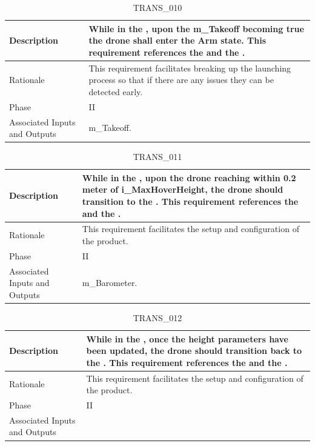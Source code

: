 \documentclass{article}
\begin{document}
\begin{table}[!h]
\begin{center}
\caption {TRANS\_010} 
\label{TRANS_013}
\begin{tabular}{ | m{3cm} | m{11cm} | }
\hline
Description & While in the \nameref{Arm State}, upon the m\_Takeoff becoming true the drone shall enter the Arm state. This requirement references the \nameref{Arm State} and the \nameref{Takeoff State}. \\
\hline
Rationale & This requirement facilitates breaking up the launching process so that if there are any issues they can be detected early.  \\
\hline
Phase & II \\
\hline
Associated Inputs and Outputs & m\_Takeoff. \\
\hline
\end{tabular}
\end{center}
\end{table}

\begin{table}[!h]
\begin{center}
\caption {TRANS\_011} 
\label{TRANS_014}
\begin{tabular}{ | m{3cm} | m{11cm} | }
\hline
Description & While in the \nameref{Takeoff State}, upon the drone reaching within 0.2 meter of i\_MaxHoverHeight, the drone should transition to the \nameref{Hover State}. This requirement references the \nameref{Hover State} and the \nameref{Takeoff State}. \\
\hline
Rationale & This requirement facilitates the setup and configuration of the product.  \\
\hline
Phase & II \\
\hline
Associated Inputs and Outputs & m\_Barometer. \\
\hline
\end{tabular}
\end{center}
\end{table}

\begin{table}[!h]
\begin{center}
\caption {TRANS\_012} 
\label{TRANS_015}
\begin{tabular}{ | m{3cm} | m{11cm} | }
\hline
Description & While in the \nameref{Configure State}, once the height parameters have been updated, the drone should transition back to the \nameref{Idle State}. This requirement references the \nameref{Configure State} and the \nameref{Idle State}. \\
\hline
Rationale & This requirement facilitates the setup and configuration of the product.  \\
\hline
Phase & II \\
\hline
Associated Inputs and Outputs & \\
\hline
\end{tabular}
\end{center}
\end{table}
\end{document}
